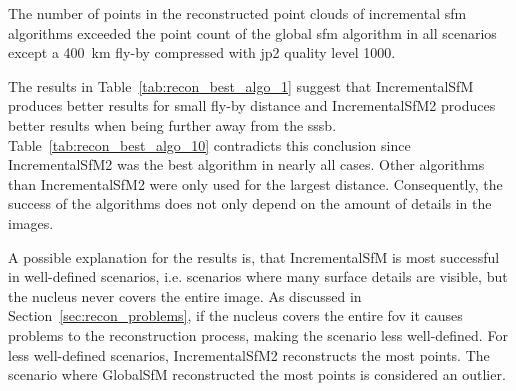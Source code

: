 
The number of points in the reconstructed point clouds of incremental \gls{sfm} algorithms exceeded the point count of the global \gls{sfm} algorithm in all scenarios except a \SI{400}{\kilo\meter} fly-by compressed with \gls{jp2} quality level 1000.

The results in Table~\ref{tab:recon_best_algo_1} suggest that IncrementalSfM produces better results for small fly-by distance and IncrementalSfM2 produces better results when being further away from the \gls{sssb}. Table~\ref{tab:recon_best_algo_10} contradicts this conclusion since IncrementalSfM2 was the best algorithm in nearly all cases. Other algorithms than IncrementalSfM2 were only used for the largest distance. Consequently, the success of the algorithms does not only depend on the amount of details in the images. 

A possible explanation for the results is, that IncrementalSfM is most successful in well-defined scenarios, i.e. scenarios where many surface details are visible, but the nucleus never covers the entire image. As discussed in Section~\ref{sec:recon_problems}, if the nucleus covers the entire \gls{fov} it causes problems to the reconstruction process, making the scenario less well-defined. For less well-defined scenarios, IncrementalSfM2 reconstructs the most points. The scenario where GlobalSfM reconstructed the most points is considered an outlier.

